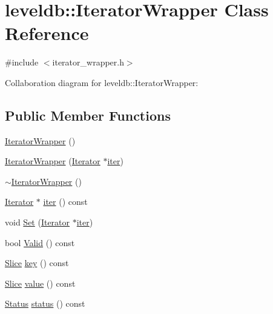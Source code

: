 \hypertarget{classleveldb_1_1_iterator_wrapper}{\section{leveldb\-:\-:Iterator\-Wrapper Class Reference}
\label{classleveldb_1_1_iterator_wrapper}
}


{\ttfamily \#include $<$iterator\-\_\-wrapper.\-h$>$}



Collaboration diagram for leveldb\-:\-:Iterator\-Wrapper\-:
\subsection*{Public Member Functions}
\begin{DoxyCompactItemize}
\item 
\hyperlink{classleveldb_1_1_iterator_wrapper_a8fba8a05ace9ed7a4f0a32f2c8eab73d}{Iterator\-Wrapper} ()
\item 
\hyperlink{classleveldb_1_1_iterator_wrapper_ab4714f21809e357b4d5b6bdbec4fe98f}{Iterator\-Wrapper} (\hyperlink{classleveldb_1_1_iterator}{Iterator} $\ast$\hyperlink{classleveldb_1_1_iterator_wrapper_a692d580f1e3deb50cd3dc52e68c6d83e}{iter})
\item 
\hyperlink{classleveldb_1_1_iterator_wrapper_acbee07d5d34bbd2e2b5590d77a4e105c}{$\sim$\-Iterator\-Wrapper} ()
\item 
\hyperlink{classleveldb_1_1_iterator}{Iterator} $\ast$ \hyperlink{classleveldb_1_1_iterator_wrapper_a692d580f1e3deb50cd3dc52e68c6d83e}{iter} () const 
\item 
void \hyperlink{classleveldb_1_1_iterator_wrapper_ae14dd8ac682dd596ba2a3d2407e1a4fd}{Set} (\hyperlink{classleveldb_1_1_iterator}{Iterator} $\ast$\hyperlink{classleveldb_1_1_iterator_wrapper_a692d580f1e3deb50cd3dc52e68c6d83e}{iter})
\item 
bool \hyperlink{classleveldb_1_1_iterator_wrapper_a42a21e1d067c50de69f1385ea65e0fc1}{Valid} () const 
\item 
\hyperlink{classleveldb_1_1_slice}{Slice} \hyperlink{classleveldb_1_1_iterator_wrapper_a1c37e4c009e2d3b58f2085022c966470}{key} () const 
\item 
\hyperlink{classleveldb_1_1_slice}{Slice} \hyperlink{classleveldb_1_1_iterator_wrapper_ae9a12c8e016afc20b493de0bfcdaac21}{value} () const 
\item 
\hyperlink{classleveldb_1_1_status}{Status} \hyperlink{classleveldb_1_1_iterator_wrapper_a1aaa880e200db3226cbf1e7373ffb6a8}{status} () const 

\end{DoxyCompactItemize}

